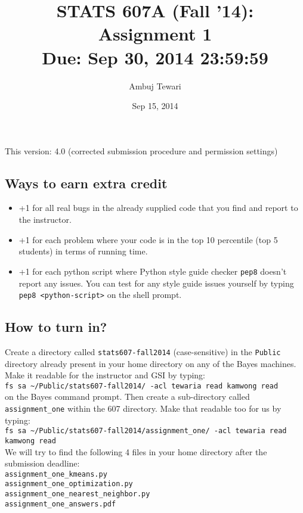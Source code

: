 \documentclass{article}
\begin{document}
\author{Ambuj Tewari}
\title{STATS 607A (Fall '14): Assignment 1\\
Due: Sep 30, 2014 23:59:59}
\date{Sep 15, 2014}

\maketitle

\begin{center}
This version: 4.0 (corrected submission procedure and permission settings)
\end{center}

\subsection*{Ways to earn extra credit}

\begin{itemize}
\item +1 for all real bugs in the already supplied code that you find and report to the instructor.
\item +1 for each problem where your code is in the top 10 percentile (top 5 students) in terms of running time.
\item +1 for each python script where Python style guide checker {\tt pep8} doesn't report any issues. You can test for any style guide issues yourself by typing
{\tt pep8 <python-script>} on the shell prompt.

\end{itemize}

\subsection*{How to turn in?}

Create a directory called {\tt stats607-fall2014} (case-sensitive) in the {\tt Public} directory already present in your home directory on any of the Bayes machines.
Make it readable for the instructor and GSI by typing:\\
\verb#fs sa ~/Public/stats607-fall2014/ -acl tewaria read kamwong read# \\
on the Bayes command prompt. Then create a sub-directory called {\tt assignment\_one} within the 607 directory. Make that readable too for us by typing:\\
\verb#fs sa ~/Public/stats607-fall2014/assignment_one/ -acl tewaria read kamwong read# \\
We will try to find the
following 4 files in your home directory after the submission deadline:\\
{\tt assignment\_one\_kmeans.py} \\
{\tt assignment\_one\_optimization.py} \\
{\tt assignment\_one\_nearest\_neighbor.py} \\
{\tt assignment\_one\_answers.pdf} \\
\end{document}
